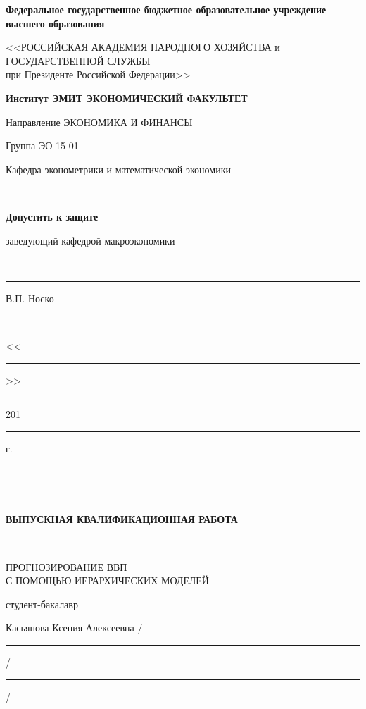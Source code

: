 \documentclass[12pt,a4paper, oneside]{extreport}
\begin{document}

\thispagestyle{empty} %

\begingroup
{}   %
\begin{center}
\small \bfseries Федеральное государственное бюджетное образовательное учреждение высшего образования

<<РОССИЙСКАЯ АКАДЕМИЯ НАРОДНОГО ХОЗЯЙСТВА и\\ ГОСУДАРСТВЕННОЙ СЛУЖБЫ \\
при Президенте Российской Федерации>>

\vspace{2ex}

\bfseries
Институт ЭМИТ ЭКОНОМИЧЕСКИЙ ФАКУЛЬТЕТ
 
Направление ЭКОНОМИКА И ФИНАНСЫ
\end{center}

\vfill


\noindent  Группа ЭО-15-01
\hfill
\parbox[t]{20em}{\centering
Кафедра эконометрики и математической экономики

\mbox{ }

\textbf{Допустить к защите}

заведующий кафедрой макроэкономики

\mbox{ }

\rule{8em}{0.5pt} В.П. Носко

\mbox{ }

<<\rule{2em}{0.5pt}>> \rule{5em}{0.5pt} 201\rule{1em}{0.5pt} г. }

\mbox{ }

\mbox{ }

\begin{center}\bfseries
ВЫПУСКНАЯ КВАЛИФИКАЦИОННАЯ РАБОТА

\mbox{ }

\large
ПРОГНОЗИРОВАНИЕ ВВП  \\
С ПОМОЩЬЮ ИЕРАРХИЧЕСКИХ МОДЕЛЕЙ
\end{center}

\vfill

\noindent\normalsize
студент-бакалавр

\noindent
Касьянова Ксения Алексеевна
\hfill /\rule{6em}{0.5pt}/\rule{6em}{0.5pt}/

\hfill{}
\end{document}
